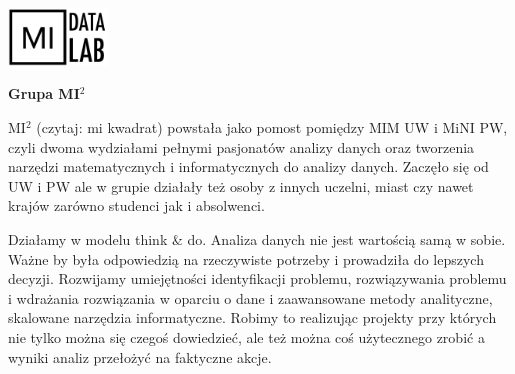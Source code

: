 \documentclass[\main/boa.tex]{subfiles}
\begin{document}
	\begin{minipage}[t]{0.915\textwidth}
		\center     
		\includegraphics[width=100px]{img/logos.bw/mi2_data_lab_napis.png} 
	\end{minipage}

\Large \textbf {Grupa MI$^{2}$}


\vskip 0.3cm
\normalsize 
MI$^{2}$ (czytaj: mi kwadrat) powstała jako pomost pomiędzy MIM UW i MiNI PW, czyli dwoma wydziałami pełnymi pasjonatów analizy danych oraz tworzenia narzędzi matematycznych i informatycznych do analizy danych. Zaczęło się od UW i PW ale w grupie działały też osoby z innych uczelni, miast czy nawet krajów zarówno studenci jak i absolwenci.

Działamy w modelu think \& do. Analiza danych nie jest wartością samą w sobie. Ważne by była odpowiedzią na rzeczywiste potrzeby i prowadziła do lepszych decyzji. Rozwijamy umiejętności identyfikacji problemu, rozwiązywania problemu i wdrażania rozwiązania w oparciu o dane i zaawansowane metody analityczne, skalowane narzędzia informatyczne. Robimy to realizując projekty przy których nie tylko można się czegoś dowiedzieć, ale też można coś użytecznego zrobić a wyniki analiz przełożyć na faktyczne akcje.
\end{document}
